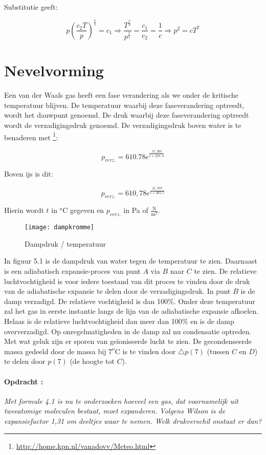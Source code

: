 Substitutie geeft:

\begin{equation}
p\left(\frac{c_{2}T}{p}\right)^{\frac{7}{5}}=c_{1}
\Rightarrow\frac{T^{\frac{7}{5}}}{p^{\frac{2}{5}}}=\frac{c_{1}}{c_{2}}=\frac{1}{c}
\Rightarrow p^{2}=cT^{7}
\end{equation}


\section{Nevelvorming}

Een van der Waals gas heeft een fase verandering als we onder de kritische
tempera\-tuur blijven. De tempera\-tuur waarbij deze faseverandering
optreedt, wordt het dauwpunt genoemd. De druk waarbij deze faseverandering
optreedt wordt de verzadigingsdruk genoemd. De verzadigingsdruk boven
water is te benaderen met \footnote{\url{http://home.kpn.nl/vanadovv/Meteo.html}}:

\begin{equation}
p_{verz.}=610.78e^{\frac{17,26t}{t+237,3}}
\end{equation}


Boven ijs is dit:

\begin{equation}
p_{verz.}=610,78e^{\frac{21,87t}{t+265.5}}
\end{equation}


Hierin wordt $t$ in $\mathrm{^{o}C}$ gegeven en $p_{verz.}$ in
Pa of $\frac{\mathrm{N}}{\mathrm{m}^{2}}$.

\begin{figure}[h]
\noindent \begin{centering}
\texttt{[image: dampkromme]}
\par\end{centering}

\caption{Dampdruk / temperatuur}
\end{figure}


In figuur 5.1 is de dampdruk van water tegen de temperatuur te zien.
Daarnaast is een adiabatisch expansie-proces van punt $A$ via $B$
naar $C$ te zien. De relatieve luchtvochtigheid is voor iedere toestand
van dit proces te vinden door de druk van de adiabatische expansie
te delen door de verzadigingsdruk. In punt $B$ is de damp verzadigd.
De relatieve vochtigheid is dan 100\%. Onder deze temperatuur zal
het gas in eerste instantie langs de lijn van de adiabatische expansie
afkoelen. Helaas is de relatieve luchtvochtigheid dan meer dan 100\%
en is de damp oververzadigd. Op onregelmatigheden in de damp zal nu
condensatie optreden. Met wat geluk zijn er sporen van geïoniseerde
lucht te zien. De gecondenseerde massa gedeeld door de massa bij $\mathrm{7^{o}C}$
is te vinden door $\triangle p(7)$ (tussen $C$ en $D$) te delen
door $p(7)$ (de hoogte tot $C$). 


\paragraph*{Opdracht :}

\emph{Met formule 4.1 is nu te onderzoeken hoeveel een gas, dat voornamelijk
uit tweeatomige moleculen bestaat, moet expanderen. Volgens Wilson
is de expansiefactor 1,31 om deeltjes waar te nemen. Welk drukverschil
onstaat er dan?}


